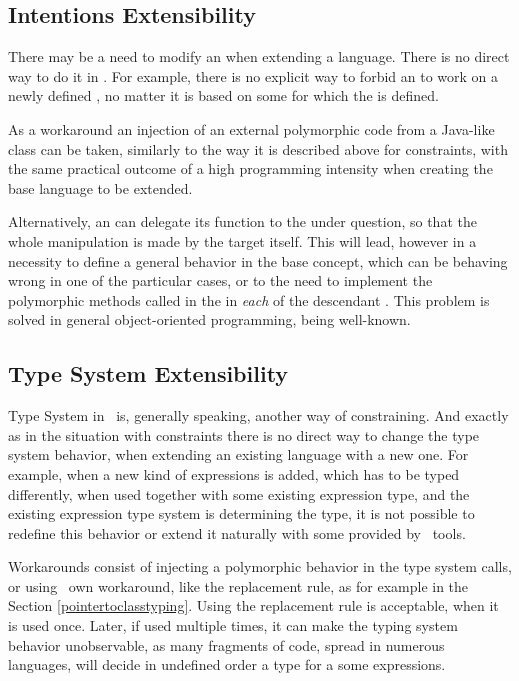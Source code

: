 \subsection{Intentions Extensibility}

There may be a need to modify an  when extending a language. There is no direct way to do it 
in \jbmps. 
For example, there is no explicit way to forbid an  to work on a newly defined , no matter
it is based on some  for which the  is defined.

As a workaround an injection of an external polymorphic code from a Java-like class can be taken, similarly to the way it is 
described above for constraints, with the same practical outcome of a high programming intensity when creating the base language to be extended.

Alternatively, an  can delegate its function to the  under question, so that the whole manipulation is 
made by the target  itself. This will lead, however in a necessity to define a general behavior in the base concept, which can
be behaving wrong in one of the particular cases, or to the need to implement the polymorphic methods called in the  in 
\emph{each} of the descendant . This problem is solved in general object-oriented programming, being well-known. 

\subsection{Type System Extensibility}

Type System in \jbmps\ is, generally speaking, another way of constraining. And exactly as in the situation with constraints 
there is no direct way to change the type system behavior, when extending an existing language with a new one. For example, 
when a new kind of expressions is added, which has to be typed differently, when used together with some existing expression type,
and the existing expression type system is determining the type, it is not possible to redefine this behavior or extend it
naturally with some provided by \jbmps\ tools.

Workarounds consist of injecting a polymorphic behavior in the type system calls, or using \jbmps\ own workaround, like 
the replacement rule, as for example in the Section \ref{pointertoclasstyping}. Using the replacement rule is acceptable, when it is used once.
Later, if used multiple times, it can make the typing system behavior unobservable, as many fragments of code, spread in numerous languages,
will decide in undefined order a type for a some expressions.

